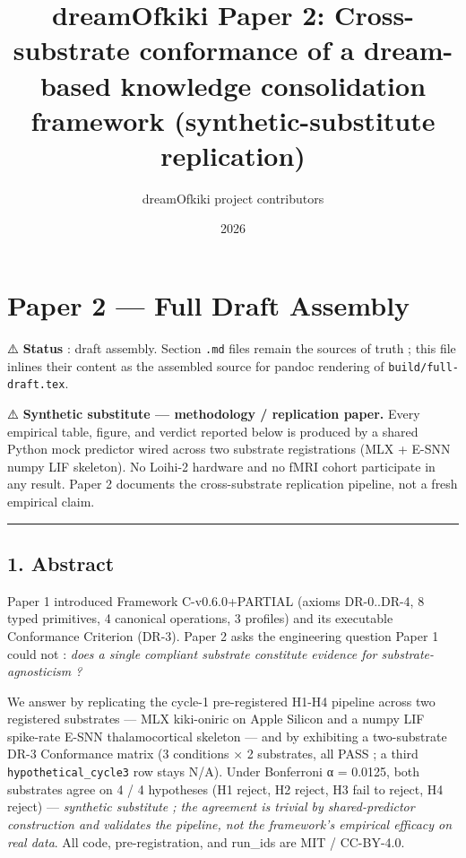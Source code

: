 \documentclass[
]{article}
\title{dreamOfkiki Paper 2: Cross-substrate conformance of a dream-based
knowledge consolidation framework (synthetic-substitute replication)}
\author{dreamOfkiki project contributors}
\date{2026}
\begin{document}
\maketitle

\section{Paper 2 --- Full Draft
Assembly}\label{paper-2-full-draft-assembly}

⚠️ \textbf{Status} : draft assembly. Section \texttt{.md} files remain
the sources of truth ; this file inlines their content as the assembled
source for pandoc rendering of \texttt{build/full-draft.tex}.

⚠️ \textbf{Synthetic substitute --- methodology / replication paper.}
Every empirical table, figure, and verdict reported below is produced by
a shared Python mock predictor wired across two substrate registrations
(MLX + E-SNN numpy LIF skeleton). No Loihi-2 hardware and no fMRI cohort
participate in any result. Paper 2 documents the cross-substrate
replication pipeline, not a fresh empirical claim.

\begin{center}\rule{0.5\linewidth}{0.5pt}\end{center}

\subsection{1. Abstract}\label{abstract}

Paper 1 introduced Framework C-v0.6.0+PARTIAL (axioms DR-0..DR-4, 8
typed primitives, 4 canonical operations, 3 profiles) and its executable
Conformance Criterion (DR-3). Paper 2 asks the engineering question
Paper 1 could not : \emph{does a single compliant substrate constitute
evidence for substrate-agnosticism ?}

We answer by replicating the cycle-1 pre-registered H1-H4 pipeline
across two registered substrates --- MLX kiki-oniric on Apple Silicon
and a numpy LIF spike-rate E-SNN thalamocortical skeleton --- and by
exhibiting a two-substrate DR-3 Conformance matrix (3 conditions × 2
substrates, all PASS ; a third \texttt{hypothetical\_cycle3} row stays
N/A). Under Bonferroni α = 0.0125, both substrates agree on 4 / 4
hypotheses (H1 reject, H2 reject, H3 fail to reject, H4 reject) ---
\emph{synthetic substitute ; the agreement is trivial by
shared-predictor construction and validates the pipeline, not the
framework's empirical efficacy on real data}. All code,
pre-registration, and run\_ids are MIT / CC-BY-4.0.
\end{document}
